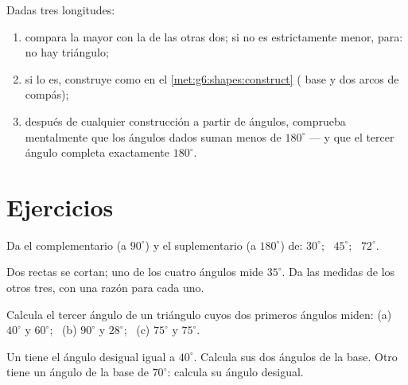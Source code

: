 \begin{method}\label{met:g7:triangles:construct}
Dadas tres longitudes:
\begin{enumerate}
  \item compara la mayor con la  de las otras dos; si no es
        estrictamente menor, para: no hay triángulo;
  \item si lo es, construye como en el \cref{met:g6:shapes:construct}
        ( base y dos arcos de compás);
  \item después de cualquier construcción a partir de ángulos, comprueba mentalmente que los
        ángulos dados suman menos de $180^\circ$ --- y que el tercer
        ángulo completa exactamente $180^\circ$.
\end{enumerate}
\end{method}

\section{Ejercicios}

\begin{exercise}[$\star$]\label{exo:g7:triangles:1}
Da el complementario (a $90^\circ$) y el suplementario (a
$180^\circ$) de: $30^\circ$; \ $45^\circ$; \ $72^\circ$.
\end{exercise}

\begin{exercise}[$\star$]\label{exo:g7:triangles:2}
Dos rectas se cortan; uno de los cuatro ángulos mide $35^\circ$. Da las
medidas de los otros tres, con una razón para cada uno.
\end{exercise}

\begin{exercise}[$\star$]\label{exo:g7:triangles:3}
Calcula el tercer ángulo de un triángulo cuyos dos primeros ángulos miden:
(a) $40^\circ$ y $60^\circ$; \
(b) $90^\circ$ y $28^\circ$; \
(c) $75^\circ$ y $75^\circ$.
\end{exercise}

\begin{exercise}[$\star$]\label{exo:g7:triangles:4}
Un  tiene el ángulo desigual igual a $40^\circ$. Calcula
sus dos ángulos de la base. Otro  tiene un ángulo de la base de
$70^\circ$: calcula su ángulo desigual.
\end{exercise}

